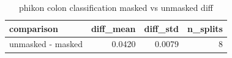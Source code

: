 \begin{table}
\caption{phikon colon classification masked vs unmasked diff}
\label{tab:phikon_colon_classification_masked_vs_unmasked_diff}
\begin{tabular}{lrrr}
\toprule
comparison & diff_mean & diff_std & n_splits \\
\midrule
unmasked - masked & 0.0420 & 0.0079 & 8 \\
\bottomrule
\end{tabular}
\end{table}
